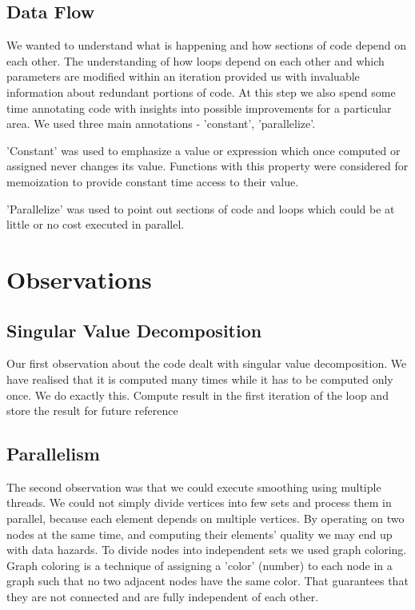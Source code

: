 \documentclass[conference]{IEEEtran}
\begin{document}
\subsection{Data Flow}
We wanted to understand what is happening and how sections of code depend on each other. 
The understanding of how loops depend on each other and which parameters are modified within an iteration provided us with invaluable information about redundant portions of code.
At this step we also spend some time annotating code with insights into possible improvements for a particular area.
We used three main annotations - 'constant', 'parallelize'.

'Constant' was used to emphasize a value or expression which once computed or assigned never changes its value. Functions with this property were considered for memoization to provide constant time access to their value.

'Parallelize' was used to point out sections of code and loops which could be at little or no cost executed in parallel.

\section{Observations}

\subsection{Singular Value Decomposition}
Our first observation about the code dealt with singular value decomposition. We have realised that it is computed many times while it has to be computed only once. We do exactly this. Compute result in the first iteration of the loop and store the result for future reference


\subsection{Parallelism}
The second observation was that we could execute smoothing using multiple threads. 
We could not simply divide vertices into few sets and process them in parallel, because each element depends on multiple vertices.
By operating on two nodes at the same time, and computing their elements' quality we may end up with data hazards.
To divide nodes into independent sets we used graph coloring.
Graph coloring is a technique of assigning a 'color' (number) to each node in a graph such that no two adjacent nodes have the same color.
That guarantees that they are not connected and are fully independent of each other.
\end{document}
